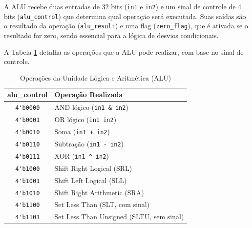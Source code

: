 \documentclass[12pt, a4paper]{article}
\begin{document}
A ALU recebe duas entradas de 32 bits (\texttt{in1} e \texttt{in2}) e um sinal de controle de 4 bits (\texttt{alu\_control}) que determina qual operação será executada. Suas saídas são o resultado da operação (\texttt{alu\_result}) e uma flag (\texttt{zero\_flag}), que é ativada se o resultado for zero, sendo essencial para a lógica de desvios condicionais.

A Tabela \ref{tab:alu_ops} detalha as operações que a ALU pode realizar, com base no sinal de controle.

\begin{table}[h!]
\centering
\caption{Operações da Unidade Lógica e Aritmética (ALU)}
\label{tab:alu_ops}
\begin{tabular}{|c|l|}
\hline
\textbf{alu\_control} & \textbf{Operação Realizada} \\
\hline
\verb|4'b0000| & AND lógico (\texttt{in1 \& in2}) \\
\verb|4'b0001| & OR lógico (\texttt{in1 \textbar{} in2}) \\
\verb|4'b0010| & Soma (\texttt{in1 + in2}) \\
\verb|4'b0110| & Subtração (\texttt{in1 - in2}) \\
\verb|4'b0111| & XOR (\texttt{in1 \textasciicircum{} in2}) \\
\verb|4'b1000| & Shift Right Logical (SRL) \\
\verb|4'b1001| & Shift Left Logical (SLL) \\
\verb|4'b1010| & Shift Right Arithmetic (SRA) \\
\verb|4'b1100| & Set Less Than (SLT, com sinal) \\
\verb|4'b1101| & Set Less Than Unsigned (SLTU, sem sinal) \\
\hline
\end{tabular}
\end{table}
\end{document}
